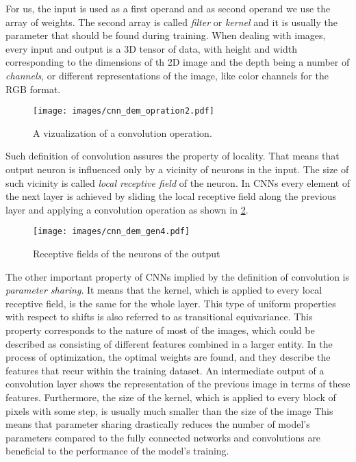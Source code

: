 For us, the input is used as a first operand and as second operand we use the array of weights.
The second array is called \emph{filter} or \emph{kernel} and it is usually the parameter that should be found during training. 
When dealing with images, every input and output is a 3D tensor of data, with height and width corresponding to the dimensions of th 2D image and the depth being a number of \emph{channels}, or different representations of the image, like color channels for the RGB format. 
\medskip
\begin{figure}[h]
	\centering
	\texttt{[image: images/cnn\_dem\_opration2.pdf]}
	\caption{A vizualization of a convolution operation.}
	\label{fig:convoper_demo}
\end{figure}
\medskip

Such definition of convolution assures the property of locality. 
That means that output neuron is influenced only by a vicinity of neurons in the input.
The size of such vicinity is called \emph{local receptive field} of the neuron.
In CNNs every element of the next layer is achieved by sliding the local receptive field along the previous layer and applying a convolution operation as shown in \ref{fig:rec_field_demo}.
\begin{figure}[ht]
	\centering
	\texttt{[image: images/cnn\_dem\_gen4.pdf]}
	\caption{Receptive fields of the neurons of the output}
	\label{fig:rec_field_demo}
\end{figure}
\medskip

The other important property of CNNs implied by the definition of convolution is \emph{parameter sharing}. 
It means that the kernel, which is applied to every local receptive field, is the same for the whole layer. 
This type of uniform properties with respect to shifts is also referred to as transitional equivariance.
This property corresponds to the nature of most of the images, which could be described as consisting of different features combined in a larger entity.
In the process of optimization, the optimal weights are found, and they describe the features that recur within the training dataset. An intermediate output of a convolution layer shows the representation of the previous image in terms of these features.
Furthermore, the size of the kernel, which is applied to every block of pixels with some step, is usually much smaller than the size of the image
This means that parameter sharing drastically reduces the number of model's parameters compared to the fully connected networks and convolutions are beneficial to the performance of the model's training.
\medskip

